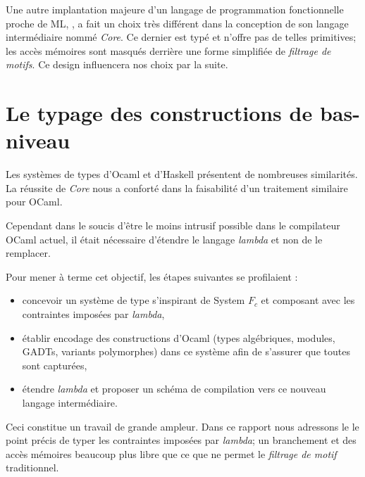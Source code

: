 Une autre implantation majeure d'un langage de programmation fonctionnelle
proche de ML, , a fait un choix très différent dans la conception
de son langage intermédiaire nommé \emph{Core}.  Ce dernier est typé et n'offre
pas de telles primitives; les accès mémoires sont masqués derrière une forme
simplifiée de \emph{filtrage de motifs}.   Ce design
influencera nos choix par la suite.

\section{Le typage des constructions de bas-niveau}

Les systèmes de types d'Ocaml et d'Haskell présentent de nombreuses
similarités. La réussite de \emph{Core} nous a conforté dans la faisabilité
d'un traitement similaire pour OCaml.

Cependant dans le soucis d'être le moins intrusif possible dans le compilateur
OCaml actuel, il était nécessaire d'étendre le langage \emph{lambda} et non de
le remplacer.

Pour mener à terme cet objectif, les étapes suivantes se profilaient :
\begin{itemize}
  \item concevoir un système de type s'inspirant de System $F_c$ et composant
    avec les contraintes imposées par \emph{lambda},
  \item établir encodage des constructions d'Ocaml (types algébriques, modules,
    GADTs, variants polymorphes) dans ce système afin de s'assurer que toutes
    sont capturées,
  \item étendre \emph{lambda} et proposer un schéma de compilation vers ce
    nouveau langage intermédiaire.
\end{itemize}

Ceci constitue un travail de grande ampleur. Dans ce rapport nous adressons le
le point précis de typer les contraintes imposées par \emph{lambda}; un
branchement et des accès mémoires beaucoup plus libre que ce que ne permet le
\emph{filtrage de motif} traditionnel.

